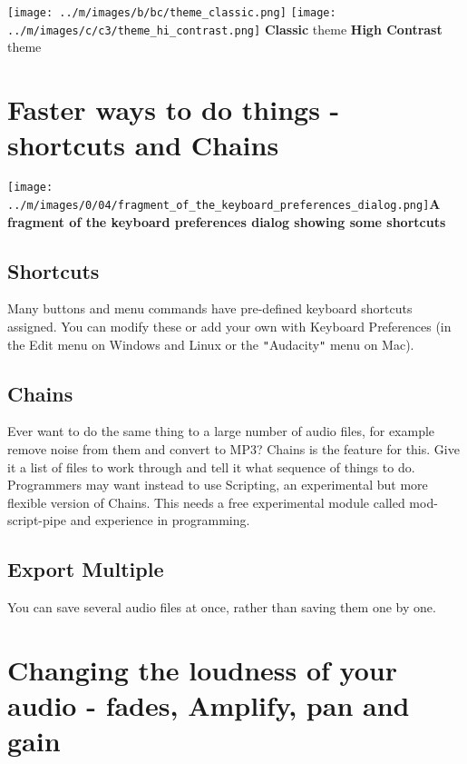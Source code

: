 \documentclass[twocolumn]{book}
\begin{document}

\* \* \* \* \texttt{[image: ../m/images/b/bc/theme\_classic.png]}
\* \* \* \* \texttt{[image: ../m/images/c/c3/theme\_hi\_contrast.png]}
\* \* \* \* 
\textbf{Classic} theme
\* \* \* \* 
\textbf{High Contrast} theme




\section{Faster ways to do things - shortcuts and Chains}

\texttt{[image: ../m/images/0/04/fragment\_of\_the\_keyboard\_preferences\_dialog.png]}\textbf{A fragment of the keyboard preferences dialog showing some shortcuts}

\subsection{Shortcuts}


Many buttons and menu commands have pre-defined keyboard shortcuts assigned.  You can modify these or add your own with Keyboard Preferences (in the Edit menu on Windows and Linux or the \texttt{{}"{}}Audacity\texttt{{}"{}} menu on Mac). 

\subsection{Chains}


Ever want to do the same thing to a large number of audio files, for example remove noise from them and convert to MP3?  Chains is the feature for this. Give it a list of files to work through and tell it what sequence of things to do. Programmers may want instead to use Scripting, an experimental but more flexible version of Chains. This needs a free experimental module called mod-script-pipe and experience in programming.

\subsection{Export Multiple}


You can save several audio files at once, rather than saving them one by one.



\section{Changing the loudness of your audio - fades, Amplify, pan and gain}
\end{document}
